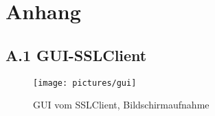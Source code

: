 \section{Anhang}
\subsection{A.1 GUI-SSLClient}
\begin{figure}[H]
\centering
\texttt{[image: pictures/gui]}
\caption{GUI vom SSLClient, Bildschirmaufnahme}
\end{figure}